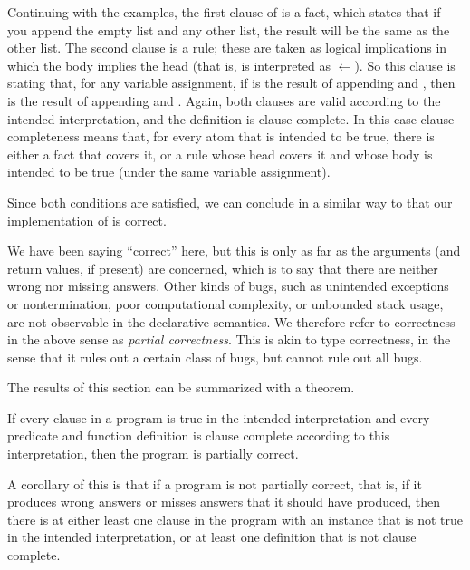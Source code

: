 Continuing with the examples,
the first clause of  is a fact, which states that
if you append the empty list and any other list,
the result will be the same as the other list.
The second clause is a rule;
these are taken as logical implications
in which the body implies the head
(that is, \co{:-} is interpreted as $\leftarrow$).
So this clause is stating that, for any variable assignment,
if  is the result of appending  and ,
then \co{[X | Cs]} is the result of
appending \co{[X | As]} and .
Again, both clauses are valid according to the intended interpretation,
and the definition is clause complete.
In this case clause completeness means that,
for every atom that is intended to be true,
there is either a fact that covers it,
or a rule whose head covers it and
whose body is intended to be true
(under the same variable assignment).

Since both conditions are satisfied,
we can conclude in a similar way to 
that our implementation of  is correct.

We have been saying ``correct'' here,
but this is only as far as the arguments
(and return values, if present)
are concerned,
which is to say that there are neither wrong nor missing answers.
Other kinds of bugs,
such as \mbox{unintended} exceptions or nontermination,
poor computational complexity,
or unbounded stack usage,
are not observable in the declarative semantics.
We therefore refer to correctness in the above sense
as \emph{partial correctness\label{gi:partial-correctness}}.
This is akin to type correctness,
in the sense that it rules out a certain class of bugs,
but cannot rule out all bugs.

The results of this section can be summarized with a theorem.

\begin{theorem} \label{thm:partial-correctness}
If every clause in a program is true in the intended interpretation
and every predicate and function definition is clause complete
according to this interpretation,
then the program is partially correct.
\end{theorem}

\noindent
A corollary of this is that if a program is not partially correct,
that is, if it produces wrong answers
or misses answers that it should have produced,
then there is at either least one clause in the program
with an instance that is not true in the intended interpretation,
or at least one definition that is not clause complete.


